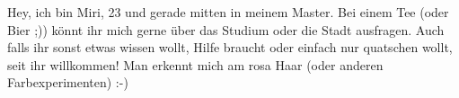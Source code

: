 \begin{multicols*}{2}
{Hey, ich bin Miri, 23 und gerade mitten in meinem Master. Bei einem Tee (oder Bier ;)) könnt ihr mich gerne über das Studium oder die Stadt ausfragen. Auch falls ihr sonst etwas wissen wollt, Hilfe braucht oder einfach nur quatschen wollt, seit ihr willkommen! Man erkennt mich am rosa Haar (oder anderen Farbexperimenten) :-)}







	

	


%
%
%
%

%
\end{multicols*}

